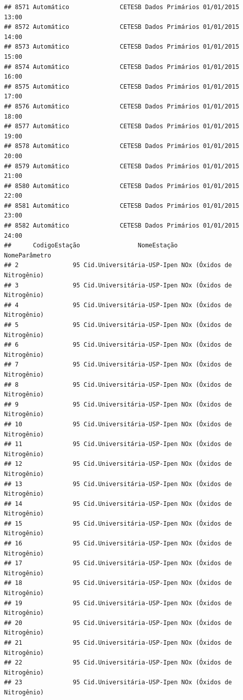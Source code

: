 \documentclass[]{book}
\begin{document}
\begin{verbatim}
## 8571 Automático              CETESB Dados Primários 01/01/2015 13:00
## 8572 Automático              CETESB Dados Primários 01/01/2015 14:00
## 8573 Automático              CETESB Dados Primários 01/01/2015 15:00
## 8574 Automático              CETESB Dados Primários 01/01/2015 16:00
## 8575 Automático              CETESB Dados Primários 01/01/2015 17:00
## 8576 Automático              CETESB Dados Primários 01/01/2015 18:00
## 8577 Automático              CETESB Dados Primários 01/01/2015 19:00
## 8578 Automático              CETESB Dados Primários 01/01/2015 20:00
## 8579 Automático              CETESB Dados Primários 01/01/2015 21:00
## 8580 Automático              CETESB Dados Primários 01/01/2015 22:00
## 8581 Automático              CETESB Dados Primários 01/01/2015 23:00
## 8582 Automático              CETESB Dados Primários 01/01/2015 24:00
##      CodigoEstação                NomeEstação              NomeParâmetro
## 2               95 Cid.Universitária-USP-Ipen NOx (Óxidos de Nitrogênio)
## 3               95 Cid.Universitária-USP-Ipen NOx (Óxidos de Nitrogênio)
## 4               95 Cid.Universitária-USP-Ipen NOx (Óxidos de Nitrogênio)
## 5               95 Cid.Universitária-USP-Ipen NOx (Óxidos de Nitrogênio)
## 6               95 Cid.Universitária-USP-Ipen NOx (Óxidos de Nitrogênio)
## 7               95 Cid.Universitária-USP-Ipen NOx (Óxidos de Nitrogênio)
## 8               95 Cid.Universitária-USP-Ipen NOx (Óxidos de Nitrogênio)
## 9               95 Cid.Universitária-USP-Ipen NOx (Óxidos de Nitrogênio)
## 10              95 Cid.Universitária-USP-Ipen NOx (Óxidos de Nitrogênio)
## 11              95 Cid.Universitária-USP-Ipen NOx (Óxidos de Nitrogênio)
## 12              95 Cid.Universitária-USP-Ipen NOx (Óxidos de Nitrogênio)
## 13              95 Cid.Universitária-USP-Ipen NOx (Óxidos de Nitrogênio)
## 14              95 Cid.Universitária-USP-Ipen NOx (Óxidos de Nitrogênio)
## 15              95 Cid.Universitária-USP-Ipen NOx (Óxidos de Nitrogênio)
## 16              95 Cid.Universitária-USP-Ipen NOx (Óxidos de Nitrogênio)
## 17              95 Cid.Universitária-USP-Ipen NOx (Óxidos de Nitrogênio)
## 18              95 Cid.Universitária-USP-Ipen NOx (Óxidos de Nitrogênio)
## 19              95 Cid.Universitária-USP-Ipen NOx (Óxidos de Nitrogênio)
## 20              95 Cid.Universitária-USP-Ipen NOx (Óxidos de Nitrogênio)
## 21              95 Cid.Universitária-USP-Ipen NOx (Óxidos de Nitrogênio)
## 22              95 Cid.Universitária-USP-Ipen NOx (Óxidos de Nitrogênio)
## 23              95 Cid.Universitária-USP-Ipen NOx (Óxidos de Nitrogênio)

\end{verbatim}
\end{document}
